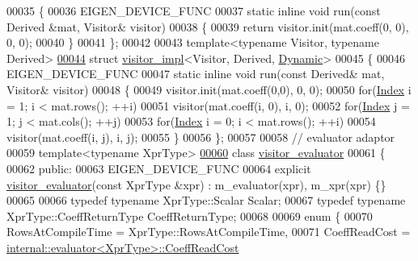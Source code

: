 \begin{DoxyCode}
00035 \{
00036   EIGEN\_DEVICE\_FUNC
00037   \textcolor{keyword}{static} \textcolor{keyword}{inline} \textcolor{keywordtype}{void} run(\textcolor{keyword}{const} Derived &mat, Visitor& visitor)
00038   \{
00039     \textcolor{keywordflow}{return} visitor.init(mat.coeff(0, 0), 0, 0);
00040   \}
00041 \};
00042 
00043 \textcolor{keyword}{template}<\textcolor{keyword}{typename} Visitor, \textcolor{keyword}{typename} Derived>
\hyperlink{struct_eigen_1_1internal_1_1visitor__impl_3_01_visitor_00_01_derived_00_01_dynamic_01_4}{00044} \textcolor{keyword}{struct }\hyperlink{struct_eigen_1_1internal_1_1visitor__impl}{visitor\_impl}<Visitor, Derived, \hyperlink{namespace_eigen_ad81fa7195215a0ce30017dfac309f0b2}{Dynamic}>
00045 \{
00046   EIGEN\_DEVICE\_FUNC
00047   \textcolor{keyword}{static} \textcolor{keyword}{inline} \textcolor{keywordtype}{void} run(\textcolor{keyword}{const} Derived& mat, Visitor& visitor)
00048   \{
00049     visitor.init(mat.coeff(0,0), 0, 0);
00050     \textcolor{keywordflow}{for}(\hyperlink{namespace_eigen_a62e77e0933482dafde8fe197d9a2cfde}{Index} i = 1; i < mat.rows(); ++i)
00051       visitor(mat.coeff(i, 0), i, 0);
00052     \textcolor{keywordflow}{for}(\hyperlink{namespace_eigen_a62e77e0933482dafde8fe197d9a2cfde}{Index} j = 1; j < mat.cols(); ++j)
00053       \textcolor{keywordflow}{for}(\hyperlink{namespace_eigen_a62e77e0933482dafde8fe197d9a2cfde}{Index} i = 0; i < mat.rows(); ++i)
00054         visitor(mat.coeff(i, j), i, j);
00055   \}
00056 \};
00057 
00058 \textcolor{comment}{// evaluator adaptor}
00059 \textcolor{keyword}{template}<\textcolor{keyword}{typename} XprType>
\hyperlink{class_eigen_1_1internal_1_1visitor__evaluator}{00060} \textcolor{keyword}{class }\hyperlink{class_eigen_1_1internal_1_1visitor__evaluator}{visitor\_evaluator}
00061 \{
00062 \textcolor{keyword}{public}:
00063   EIGEN\_DEVICE\_FUNC
00064   \textcolor{keyword}{explicit} \hyperlink{class_eigen_1_1internal_1_1visitor__evaluator}{visitor\_evaluator}(\textcolor{keyword}{const} XprType &xpr) : m\_evaluator(xpr), m\_xpr(xpr) \{\}
00065   
00066   \textcolor{keyword}{typedef} \textcolor{keyword}{typename} XprType::Scalar Scalar;
00067   \textcolor{keyword}{typedef} \textcolor{keyword}{typename} XprType::CoeffReturnType CoeffReturnType;
00068   
00069   \textcolor{keyword}{enum} \{
00070     RowsAtCompileTime = XprType::RowsAtCompileTime,
00071     CoeffReadCost = \hyperlink{struct_eigen_1_1internal_1_1evaluator}{internal::evaluator<XprType>::CoeffReadCost}

\end{DoxyCode}
